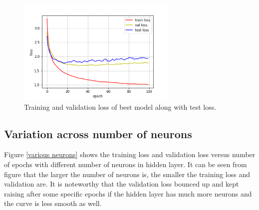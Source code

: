 \documentclass{article}
\begin{document}
\begin{figure}[H]
\begin{center}
  \centering
  \includegraphics[width=3in]{image/b_lstm.png}
\end{center}
\caption{Training and validation loss of best model along with test loss.}
\label{b: loss}
\end{figure}

\subsection{Variation across number of neurons}

Figure \ref{various neurons} shows the training loss and validation loss versus number of epochs with different number of neurons in hidden layer. It can be seen from figure that the larger the number of neurons is, the smaller the training loss and validation are. It is noteworthy that the validation loss bounced up and kept raising after some specific epochs if the hidden layer has much more neurons and the curve is less smooth as well.
\end{document}
